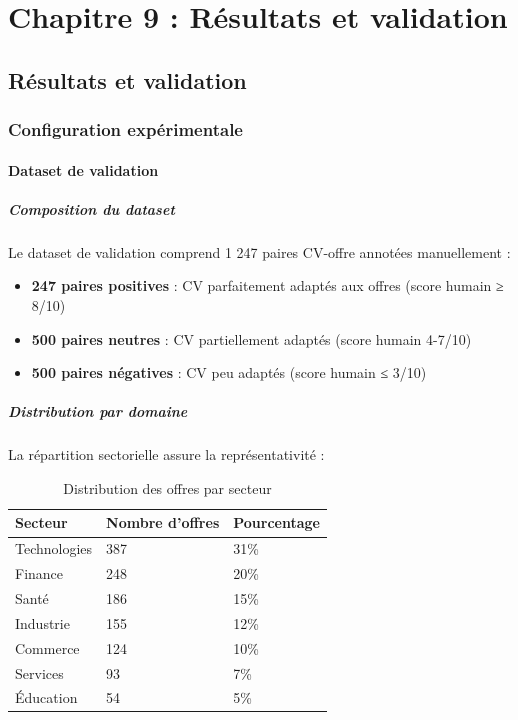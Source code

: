 \documentclass[12pt,a4paper]{report}
\begin{document}
\part{Chapitre 9 : Résultats et validation}
\chapter{Résultats et validation}

\section{Configuration expérimentale}

\subsection{Dataset de validation}

\subsubsection{Composition du dataset}

Le dataset de validation comprend 1 247 paires CV-offre annotées manuellement :
\begin{itemize}
\item \textbf{247 paires positives} : CV parfaitement adaptés aux offres (score humain ≥ 8/10)
\item \textbf{500 paires neutres} : CV partiellement adaptés (score humain 4-7/10)
\item \textbf{500 paires négatives} : CV peu adaptés (score humain ≤ 3/10)
\end{itemize}

\subsubsection{Distribution par domaine}

La répartition sectorielle assure la représentativité :
\begin{table}[H]
\centering
\caption{Distribution des offres par secteur}
\label{tab:distribution-secteurs}
\begin{tabular}{@{}lll@{}}
\toprule
Secteur & Nombre d'offres & Pourcentage \\
\midrule
Technologies & 387 & 31\% \\
Finance & 248 & 20\% \\
Santé & 186 & 15\% \\
Industrie & 155 & 12\% \\
Commerce & 124 & 10\% \\
Services & 93 & 7\% \\
Éducation & 54 & 5\% \\
\bottomrule
\end{tabular}
\end{table}
\end{document}
